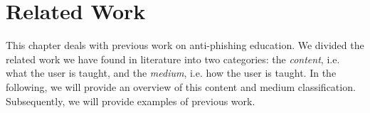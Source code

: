 
\section{Related Work}
\label{s:related_work}

This chapter deals with previous work on anti-phishing education. We divided the related work we have found in literature into two categories: the \textit{content}, i.e. what the user is taught, and the 
\textit{medium}, i.e. how the user is taught. In the following, we will provide an overview of this content and medium classification. Subsequently, we will provide examples of previous work.


